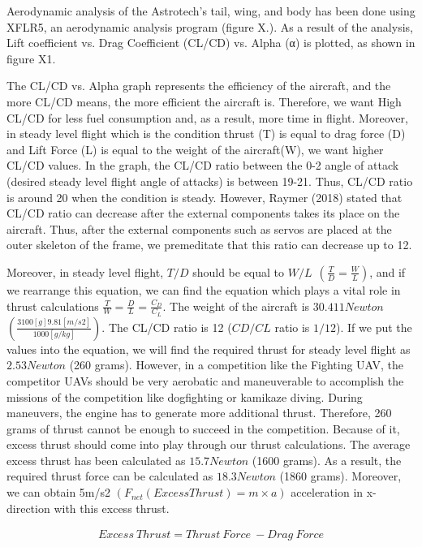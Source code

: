 \documentclass[12pt]{article}
\begin{document}
Aerodynamic analysis of the Astrotech’s tail, wing, and body has been done using XFLR5, an aerodynamic analysis program (figure X.). As a result of the analysis, Lift coefficient vs. Drag Coefficient (CL/CD) vs. Alpha (α) is plotted, as shown in figure X1. %

The CL/CD vs. Alpha graph represents the efficiency of the aircraft, and the more CL/CD means, the more efficient the aircraft is. Therefore, we want High CL/CD for less fuel consumption and, as a result, more time in flight. Moreover, in steady level flight which is the condition thrust (T) is equal to drag force (D) and Lift Force (L) is equal to the weight of the aircraft(W), we want higher CL/CD values. In the graph, the CL/CD ratio between the 0-2 angle of attack (desired steady level flight angle of attacks) is between 19-21.  Thus, CL/CD ratio is around 20 when the condition is steady. However, Raymer (2018) stated that CL/CD ratio can decrease after the external components takes its place on the aircraft. Thus, after the external components such as servos are placed at the outer skeleton of the frame, we premeditate that this ratio can decrease up to 12. 


Moreover, in steady level flight, $T/D$ should be equal to $W/L \ \  (\frac{T}{D}=\frac{W}{L})$, and if we rearrange this equation, we can find the equation which plays a vital role in thrust calculations $\frac{T}{W}=\frac{D}{L}=\frac{C_D}{C_L}$. The weight of the aircraft is $30.411 Newton$ $(\frac{3100[g]9.81[m/s2]}{1000[g/kg]})$. The CL/CD ratio is 12 ($CD/CL$ ratio is $1/12$). If we put the values into the equation, we will find the required thrust for steady level flight as $2.53 Newton$ (260 grams). However, in a competition like the Fighting UAV, the competitor UAVs should be very aerobatic and maneuverable to accomplish the missions of the competition like dogfighting or kamikaze diving. During maneuvers, the engine has to generate more additional thrust. Therefore, 260 grams of thrust cannot be enough to succeed in the competition. Because of it, excess thrust should come into play through our thrust calculations. The average excess thrust has been calculated as $15.7 Newton$ (1600 grams). As a result, the required thrust force can be calculated as $18.3 Newton$ (1860 grams). Moreover, we can obtain 5m/s2 $(F_{net} (Excess Thrust) = m \times a )$ acceleration in x-direction with this excess thrust.       

\begin{align}
	Excess \ Thrust = Thrust \ Force \ - Drag \ Force
\end{align}
\end{document}
